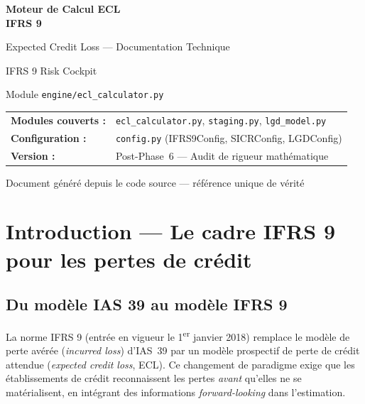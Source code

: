 \documentclass[12pt,a4paper]{article}
\begin{document}
\begin{titlepage}
\centering
\vspace*{3cm}

{\Huge\bfseries\color{darkblue} Moteur de Calcul ECL\\[0.3cm] IFRS 9}

\vspace{1cm}
{\Large\color{steelblue} Expected Credit Loss --- Documentation Technique}

\vspace{2cm}
{\large IFRS 9 Risk Cockpit}

\vspace{0.5cm}
{\normalsize Module \texttt{engine/ecl\_calculator.py}}

\vspace{3cm}

\begin{tabular}{ll}
\textbf{Modules couverts :} & \texttt{ecl\_calculator.py}, \texttt{staging.py}, \texttt{lgd\_model.py} \\
\textbf{Configuration :}    & \texttt{config.py} (IFRS9Config, SICRConfig, LGDConfig) \\
\textbf{Version :}          & Post-Phase~6 --- Audit de rigueur math\'ematique \\
\end{tabular}

\vfill
{\small\color{gray} Document g\'en\'er\'e depuis le code source --- r\'ef\'erence unique de v\'erit\'e}
\end{titlepage}

\tableofcontents
\newpage

\section{Introduction --- Le cadre IFRS 9 pour les pertes de cr\'edit}

\subsection{Du mod\`ele IAS 39 au mod\`ele IFRS 9}

La norme IFRS 9 (entr\'ee en vigueur le 1\textsuperscript{er} janvier 2018) remplace le mod\`ele de perte av\'er\'ee (\textit{incurred loss}) d'IAS~39 par un mod\`ele prospectif de perte de cr\'edit attendue (\textit{expected credit loss}, ECL). Ce changement de paradigme exige que les \'etablissements de cr\'edit reconnaissent les pertes \emph{avant} qu'elles ne se mat\'erialisent, en int\'egrant des informations \textit{forward-looking} dans l'estimation.
\end{document}
